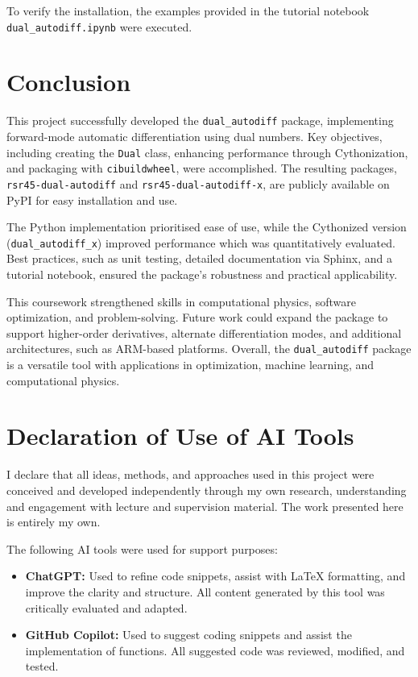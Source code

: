 \documentclass[a4paper,12pt]{article}
\begin{document}
To verify the installation, the examples provided in the tutorial notebook \texttt{dual\_autodiff.ipynb} were executed. 




\section{Conclusion}

This project successfully developed the \texttt{dual\_autodiff} package, implementing forward-mode automatic differentiation using dual numbers. Key objectives, including creating the \texttt{Dual} class, enhancing performance through Cythonization, and packaging with \texttt{cibuildwheel}, were accomplished. The resulting packages, \texttt{rsr45-dual-autodiff} and \texttt{rsr45-dual-autodiff-x}, are publicly available on PyPI for easy installation and use.

The Python implementation prioritised ease of use, while the Cythonized version (\texttt{dual\_autodiff\_x}) improved performance which was quantitatively evaluated. Best practices, such as unit testing, detailed documentation via Sphinx, and a tutorial notebook, ensured the package's robustness and practical applicability.

This coursework strengthened skills in computational physics, software optimization, and problem-solving. Future work could expand the package to support higher-order derivatives, alternate differentiation modes, and additional architectures, such as ARM-based platforms. Overall, the \texttt{dual\_autodiff} package is a versatile tool with applications in optimization, machine learning, and computational physics.

\printbibliography

\section*{Declaration of Use of AI Tools}

I declare that all ideas, methods, and approaches used in this project were conceived and developed independently through my own research, understanding and engagement with lecture and supervision material. The work presented here is entirely my own.

The following AI tools were used for support purposes:
\begin{itemize}
    \item \textbf{ChatGPT:} Used to refine code snippets, assist with LaTeX formatting, and improve the clarity and structure. All content generated by this tool was critically evaluated and adapted.
    \item \textbf{GitHub Copilot:} Used to suggest coding snippets and assist the implementation of functions. All suggested code was reviewed, modified, and tested.
\end{itemize}
\end{document}
